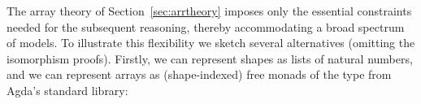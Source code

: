The array theory of Section~\ref{sec:arrtheory} imposes only the essential
constraints needed for the subsequent reasoning, thereby accommodating a broad
spectrum of models.  To illustrate this flexibility we sketch several
alternatives (omitting the isomorphism proofs). Firstly, we can represent
shapes as lists of natural numbers, and we can represent arrays as
(shape-indexed) free monads of the  type from Agda's standard library:
\begin{code}[hide]%
\>[0]\AgdaSpace{}%
\AgdaSpace{}%
\<%
\\
\>[0][@{}l@{\AgdaIndent{0}}]%
\>[2]\AgdaSpace{}%
\AgdaSpace{}%
\<%
\\
%
\>[2]\AgdaSpace{}%
\AgdaSpace{}%
\AgdaSpace{}%
\AgdaSpace{}%
\AgdaSymbol{(}\AgdaOperator{\AgdaFunction{[\AgdaUnderscore{}]}}\AgdaSymbol{;}\AgdaSpace{}%
\AgdaOperator{\AgdaFunction{\AgdaUnderscore{}++\AgdaUnderscore{}}}\AgdaSymbol{)}\<%
\\
%
\>[2]\AgdaSpace{}%
\AgdaSpace{}%
\<%
\\
%
\\[\AgdaEmptyExtraSkip]%
%
\>[2]\AgdaSpace{}%
\<%
\\
\>[2][@{}l@{\AgdaIndent{0}}]%
\>[4]\AgdaSpace{}%
\AgdaSpace{}%
\AgdaSymbol{:}\AgdaSpace{}%
\AgdaSpace{}%
\<%
\\
%
\>[4]\AgdaSpace{}%
\AgdaSpace{}%
\AgdaSymbol{:}\AgdaSpace{}%
\<%
\end{code}
\begin{mathpar}
\end{mathpar}
